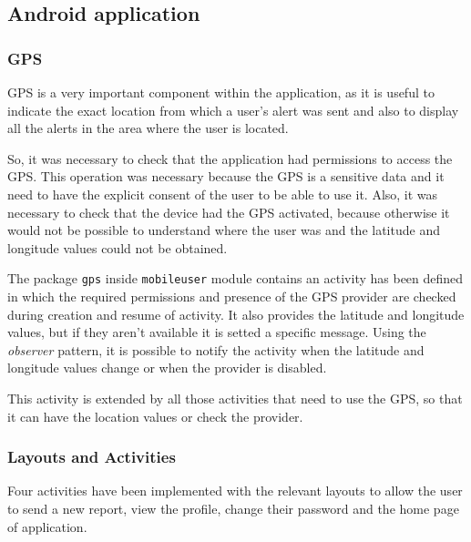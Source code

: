 \documentclass[a4paper,12pt]{report}
\begin{document}
\subsection{Android application}
\subsubsection{GPS}
GPS is a very important component within the application, as it is useful to indicate the exact location from which a user's alert was sent and also to display all the alerts in the area where the user is located.

So, it was necessary to check that the application had permissions to access the GPS. This operation was necessary because the GPS is a sensitive data and it need to have the explicit consent of the user to be able to use it. Also, it was necessary to check that the device had the GPS activated, because otherwise it would not be possible to understand where the user was and the latitude and longitude values could not be obtained.

The package \texttt{gps} inside \texttt{mobileuser} module contains an activity has been defined in which the required permissions and presence of the GPS provider are checked during creation and resume of activity. It also provides the latitude and longitude values, but if they aren't available it is setted a specific message. Using the \emph{observer} pattern, it is possible to notify the activity when the latitude and longitude values change or when the provider is disabled.

This activity is extended by all those activities that need to use the GPS, so that it can have the location values or check the provider.

\subsubsection{Layouts and Activities}
Four activities have been implemented with the relevant layouts to allow the user to send a new report, view the profile, change their password and the home page of application.
\end{document}

